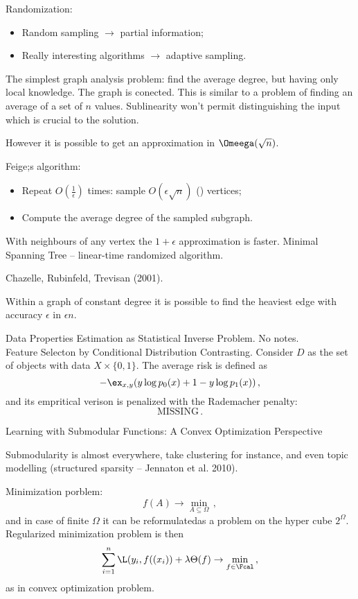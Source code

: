 Randomization: \begin{itemize}
	\item Random sampling $\to$ partial information;
	\item Really interesting algorithms $\to$ adaptive sampling.
\end{itemize}

The simplest graph analysis problem: find the average degree, but having only
local knowledge. The graph is conected. This is similar to a problem of finding
an average of a set of $n$ values. Sublinearity won't permit distinguishing the
input which is crucial to the solution.

However it is possible to get an approximation in $\Omeega(\sqrt{n})$.

Feige;s algorithm: \begin{itemize}
	\item Repeat $O(\frac{1}{\epsilon})$ times: sample $O(\epsilon\sqrt{n})$ (\wat)
		vertices;
	\item Compute the average degree of the sampled subgraph.
\end{itemize}
With neighbours of any vertex the $1+\epsilon$ approximation is faster.
Minimal Spanning Tree -- linear-time randomized algorithm.

Chazelle, Rubinfeld, Trevisan (2001).

Within a graph of constant degree it is possible to find the heaviest edge with
accuracy $\epsilon$ in $\epsilon n$.


Data Properties Estimation as Statistical Inverse Problem.
\noindent No notes. \hfill\\

Feature Selecton by Conditional Distribution Contrasting.
Consider $D$ as the set of objects with data $X\times \{0,1\}$.
The average risk is defined as
\[ -\ex_{x,y} ( y\log p_0(x) + {1-y}\log p_1(x)) \,, \]
and its empritical verison is penalized with the Rademacher penalty:
\[ \text{MISSING} \,.\]

Learning with Submodular Functions: A Convex Optimization Perspective

Submodularity is almost everywhere, take clustering for instance, and even
topic modelling (structured sparsity -- Jennaton et al. 2010).

Minimization porblem:
\[ f(A) \to \min_{A\subseteq \Omega}\,, \]
and in case of finite $\Omega$ it can be reformulatedas a problem on the 
hyper cube $2^\Omega$. Regularized minimization problem is then
\[ \sum_{i=1}^n \L(y_i, f((x_i)) + \lambda \Theta(f) \to \min_{f\in \Fcal} \,,\]
as in convex optimization problem.

